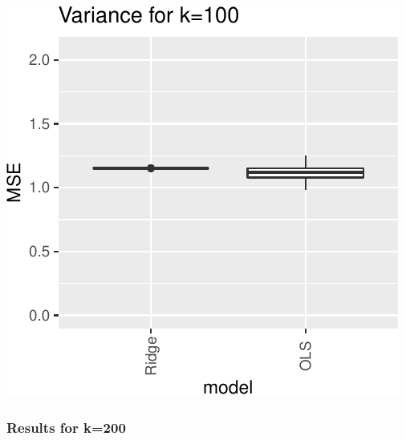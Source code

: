 \documentclass[
]{article}
\begin{document}
\includegraphics[width=0.8\linewidth]{report_files/figure-latex/unnamed-chunk-3-6}

\hypertarget{results-for-k200}{%
\subsubsection{Results for k=200}\label{results-for-k200}}
\end{document}
